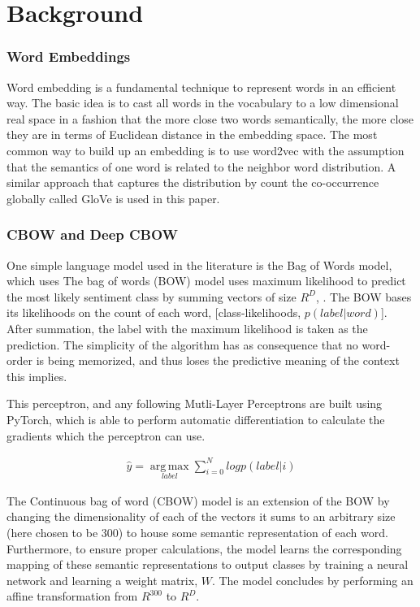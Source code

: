 \section{Background}
\label{sec: background}
\subsubsection{Word Embeddings}
Word embedding is a fundamental technique to represent words in an efficient
way. The basic idea is to cast all words in the vocabulary to a low dimensional
real space in a fashion that the more close two words semantically, the more
close they are in terms of Euclidean distance in the embedding space. The most
common way to build up an embedding is to use
word2vec\cite{mikolov2013distributed} with the assumption that the semantics of
one word is related to the neighbor word distribution. A similar approach that
captures the distribution by count the co-occurrence globally called
GloVe\cite{pennington2014glove} is used in this paper.


\subsubsection{CBOW and Deep CBOW}
One simple language model used in the literature is the Bag of Words model,
which uses
The bag of words (BOW) model uses maximum likelihood to predict the most likely
sentiment class by summing vectors of size $R^{D}$, . The BOW bases its
likelihoods on the count of each word, [class-likelihoods, $p(label|word)$].
After summation, the label with the maximum likelihood is taken as the
prediction. The simplicity of the algorithm has as consequence that no
word-order is being memorized, and thus loses the predictive meaning of the
context this implies.


This perceptron,
and any following Mutli-Layer Perceptrons are built using PyTorch, which is able
to perform automatic differentiation\cite{paszke2017automatic} to calculate the
gradients which the perceptron can use.



\begin{align*}
    \hat{y} = \operatorname*{arg\,max}_{label} \sum^{N}_{i=0} log p(label|i)
\end{align*}

The Continuous bag of word (CBOW) model is an extension of the BOW by changing
the dimensionality of each of the vectors it sums to an arbitrary size (here
chosen to be 300) to house some semantic representation of each word.
Furthermore, to ensure proper calculations, the model learns the corresponding
mapping of these semantic representations to output classes by training a neural
network and learning a weight matrix, $W$. The model concludes by performing an
affine transformation from $R^{300}$ to $R^D$.

